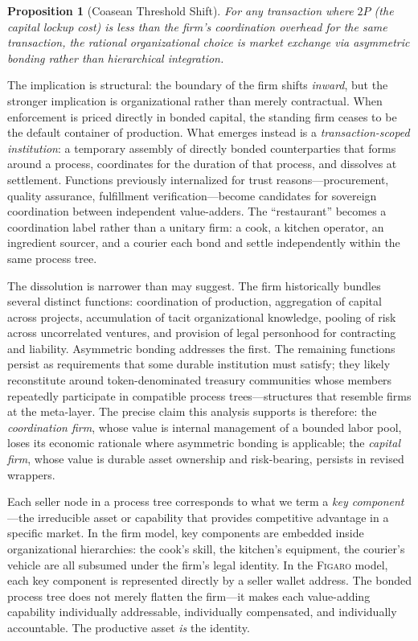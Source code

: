 \documentclass[11pt,a4paper]{article}
\newtheorem{proposition}[theorem]{Proposition}
\theoremstyle{definition}
\theoremstyle{remark}
\newcommand{\figaro}{\textsc{Figaro}}
\newcommand{\pay}{P}           %
\begin{document}
\begin{proposition}[Coasean Threshold Shift]
\label{prop:coasean-shift}
For any transaction where $2\pay$ (the capital lockup cost) is less than
the firm's coordination overhead for the same transaction, the rational
organizational choice is market exchange via asymmetric bonding rather
than hierarchical integration.
\end{proposition}

The implication is structural: the boundary of the firm shifts
\emph{inward}, but the stronger implication is organizational rather
than merely contractual. When enforcement is priced directly in bonded
capital, the standing firm ceases to be the default container of
production. What emerges instead is a \emph{transaction-scoped
institution}: a temporary assembly of directly bonded counterparties
that forms around a process, coordinates for the duration of that
process, and dissolves at settlement. Functions previously internalized
for trust reasons---procurement, quality assurance, fulfillment
verification---become candidates for sovereign coordination between
independent value-adders. The ``restaurant'' becomes a coordination
label rather than a unitary firm: a cook, a kitchen operator, an
ingredient sourcer, and a courier each bond and settle independently
within the same process tree.

The dissolution is narrower than  may suggest.
The firm historically bundles several distinct functions: coordination
of production, aggregation of capital across projects, accumulation of
tacit organizational knowledge, pooling of risk across uncorrelated
ventures, and provision of legal personhood for contracting and
liability. Asymmetric bonding addresses the first. The remaining
functions persist as requirements that some durable institution must
satisfy; they likely reconstitute around token-denominated treasury
communities whose members repeatedly participate in compatible process
trees---structures that resemble firms at the meta-layer. The precise
claim this analysis supports is therefore: the \emph{coordination
firm}, whose value is internal management of a bounded labor pool,
loses its economic rationale where asymmetric bonding is applicable;
the \emph{capital firm}, whose value is durable asset ownership and
risk-bearing, persists in revised wrappers.

Each seller node in a process tree corresponds to what we term a
\emph{key component}---the irreducible asset or capability that
provides competitive advantage in a specific market. In the firm model, key components are
embedded inside organizational hierarchies: the cook's skill, the
kitchen's equipment, the courier's vehicle are all subsumed under the
firm's legal identity. In the \figaro{} model, each key component is
represented directly by a seller wallet address. The bonded process
tree does not merely flatten the firm---it makes each value-adding
capability individually addressable, individually compensated, and
individually accountable. The productive asset \emph{is} the identity.
\end{document}
